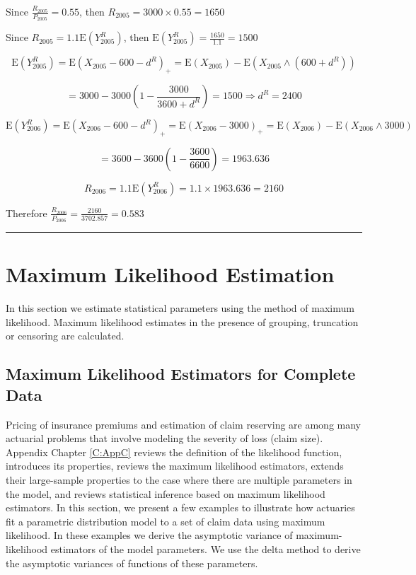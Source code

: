 \documentclass[]{book}
\theoremstyle{definition}
\theoremstyle{definition}
\theoremstyle{definition}
\theoremstyle{remark}
\begin{document}
Since \(\frac{R_{2005}}{P_{2005}} = 0.55\), then
\(R_{2005} = 3000 \times 0.55 = 1650\)

Since \(R_{2005} = 1.1\mathrm{E}\left( Y_{2005}^{R} \right)\), then
\(\mathrm{E}\left( Y_{2005}^{R} \right) = \frac{1650}{1.1} = 1500\)

\[\mathrm{E}\left( Y_{2005}^{R} \right) = \mathrm{E}\left( X_{2005} - 600 - d^{R} \right)_{+} = \mathrm{E}\left( X_{2005} \right) - \mathrm{E}\left( X_{2005} \land \left( 600 + d^{R} \right) \right)\]

\[= 3000 - 3000\left( 1 - \frac{3000}{3600 + d^{R}} \right) = 1500 \Rightarrow d^{R} = 2400\]

\[\mathrm{E}\left( Y_{2006}^{R} \right) = \mathrm{E}\left( X_{2006} - 600 - d^{R} \right)_{+} = \mathrm{E}\left( X_{2006} - 3000 \right)_{+} = \mathrm{E}\left( X_{2006} \right) - \mathrm{E}\left( X_{2006} \land 3000 \right)\]

\[= 3600 - 3600\left( 1 - \frac{3600}{6600} \right) = 1963.636\]

\[R_{2006} = 1.1\mathrm{E}\left( Y_{2006}^{R} \right) = 1.1 \times 1963.636 = 2160\]

Therefore \(\frac{R_{2006}}{P_{2006}} = \frac{2160}{3702.857} = 0.583\)

\begin{center}\rule{0.5\linewidth}{\linethickness}\end{center}

\section{Maximum Likelihood Estimation}\label{S:MaxLikeEstimation}

In this section we estimate statistical parameters using the method of
maximum likelihood. Maximum likelihood estimates in the presence of
grouping, truncation or censoring are calculated.

\subsection{Maximum Likelihood Estimators for Complete
Data}\label{maximum-likelihood-estimators-for-complete-data}

Pricing of insurance premiums and estimation of claim reserving are
among many actuarial problems that involve modeling the severity of loss
(claim size). Appendix Chapter \ref{C:AppC} reviews the definition of
the likelihood function, introduces its properties, reviews the maximum
likelihood estimators, extends their large-sample properties to the case
where there are multiple parameters in the model, and reviews
statistical inference based on maximum likelihood estimators. In this
section, we present a few examples to illustrate how actuaries fit a
parametric distribution model to a set of claim data using maximum
likelihood. In these examples we derive the asymptotic variance of
maximum-likelihood estimators of the model parameters. We use the delta
method to derive the asymptotic variances of functions of these
parameters.
\end{document}

